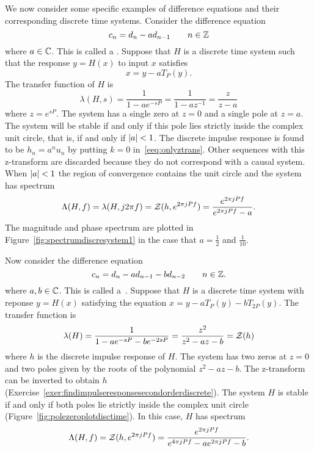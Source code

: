 We now consider some specific examples of difference equations and their corresponding discrete time systems.  Consider the difference equation
\begin{equation}\label{eq:firstorderdifferenceequation}
c_n = d_n - a d_{n-1} \qquad n \in {\mathbb Z}
\end{equation}
where $a \in {\mathbb C}$.  This is called a .  Suppose that $H$ is a discrete time system such that the response $y = H(x)$ to input $x$ satisfies
\[
x = y - a T_{P}(y).
\]
The transfer function of $H$ is
\[
\lambda(H,s) = \frac{1}{1 - a e^{-sP}} = \frac{1}{1 - a z^{-1}} = \frac{z}{z - a}
\]
where $z = e^{sP}$.  The system has a single zero at $z=0$ and a single pole at $z = a$.  The system will be stable if and only if this pole lies strictly inside the complex unit circle, that is, if and only if $\left\vert a \right\vert < 1$.  The discrete impulse response is found to be $h_n = a^n u_n$ by putting $k=0$ in~\eqref{eeq:onlyztrans}.  Other sequences with this z-transform are discarded because they do not correspond with a causal system.  %
When $\left\vert a \right\vert < 1$ the region of convergence contains the unit circle and the system has spectrum
\[
\Lambda(H,f) = \lambda(H,j2\pi f) = {\mathcal Z}(h, e^{2\pi j P f}) = \frac{e^{2\pi j P f}}{e^{2\pi j P f} - a}.
\]
The magnitude and phase spectrum are plotted in Figure~\ref{fig:spectrumdiscresystem1} in the case that $a = \tfrac{1}{2}$ and $\tfrac{1}{10}$.

Now consider the difference equation
\[
c_n = d_n - a d_{n-1} - b d_{n-2} \qquad n \in {\mathbb Z}.
\]
where $a,b \in {\mathbb C}$.  This is called a~.  Suppose that $H$ is a discrete time system with reponse $y=H(x)$ satisfying the equation $x = y - aT_{P}(y) - b T_{2P}(y)$.  The transfer function is
\[
\lambda(H) = \frac{1}{1 - a e^{-sP} - b e^{-2sP}} = \frac{z^2}{z^2 - a z - b} = {\mathcal Z}(h)
\]
where $h$ is the discrete impulse response of $H$.  The system has two zeros at $z = 0$ and two poles given by the roots of the polynomial $z^2 - a z - b$.  The z-transform can be inverted to obtain $h$ (Exercise~\ref{exer:findimpulseresponsesecondorderdiscrete}).  The system $H$ is stable if and only if both poles lie strictly inside the complex unit circle (Figure~\ref{fig:polezeroplotdisctime}).  In this case, $H$ has spectrum
\[
\Lambda(H,f) = {\mathcal Z}(h, e^{2\pi j P f}) = \frac{e^{2\pi jP f}}{e^{4\pi jP f} - a e^{2\pi jP f} - b}.
\]

